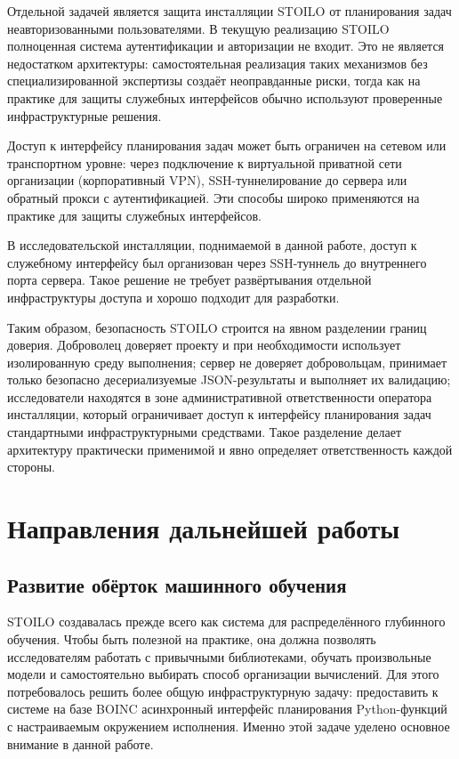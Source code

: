 \documentclass[a4paper,12pt]{extarticle}
\begin{document}
Отдельной задачей является защита инсталляции STOILO от планирования задач неавторизованными пользователями.
В текущую реализацию STOILO полноценная система аутентификации и авторизации не входит.
Это не является недостатком архитектуры: самостоятельная реализация таких механизмов без специализированной экспертизы создаёт неоправданные риски, тогда как на практике для защиты служебных интерфейсов обычно используют проверенные инфраструктурные решения.

Доступ к интерфейсу планирования задач может быть ограничен на сетевом или транспортном уровне: через подключение к виртуальной приватной сети организации (корпоративный VPN), SSH-туннелирование до сервера или обратный прокси с аутентификацией.
Эти способы широко применяются на практике для защиты служебных интерфейсов.

В исследовательской инсталляции, поднимаемой в данной работе, доступ к служебному интерфейсу был организован через SSH-туннель до внутреннего порта сервера.
Такое решение не требует развёртывания отдельной инфраструктуры доступа и хорошо подходит для разработки.

Таким образом, безопасность STOILO строится на явном разделении границ доверия.
Доброволец доверяет проекту и при необходимости использует изолированную среду выполнения;
сервер не доверяет добровольцам, принимает только безопасно десериализуемые JSON-результаты и выполняет их валидацию;
исследователи находятся в зоне административной ответственности оператора инсталляции, который ограничивает доступ к интерфейсу планирования задач стандартными инфраструктурными средствами.
Такое разделение делает архитектуру практически применимой и явно определяет ответственность каждой стороны.

\section{Направления дальнейшей работы} \label{sec:future_work}

\subsection{Развитие обёрток машинного обучения}

STOILO создавалась прежде всего как система для распределённого глубинного обучения.
Чтобы быть полезной на практике, она должна позволять исследователям работать с привычными библиотеками, обучать произвольные модели и самостоятельно выбирать способ организации вычислений.
Для этого потребовалось решить более общую инфраструктурную задачу: предоставить к системе на базе BOINC асинхронный интерфейс планирования Python-функций с настраиваемым окружением исполнения.
Именно этой задаче уделено основное внимание в данной работе.
\end{document}
